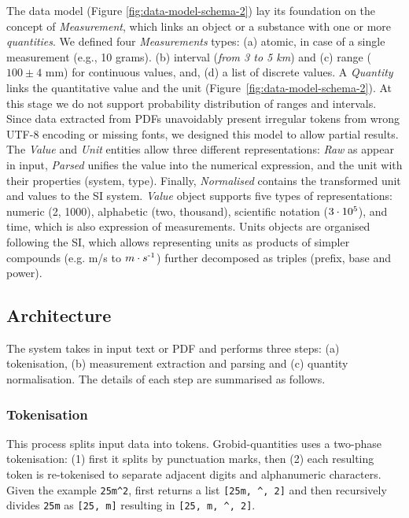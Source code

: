 \documentclass[sigconf]{acmart}
\begin{document}
The data model (Figure \ref{fig:data-model-schema-2}) lay its foundation on the concept of \textit{Measurement}, which links an object or a substance with one or more \textit{quantities}. We defined four \textit{Measurements} types: (a) atomic, in case of a single measurement (e.g., 10 grams). (b) interval (\textit{from 3 to 5 km}) and (c) range ($100 \pm 4$ mm) for continuous values, and, (d) a list of discrete values. A \textit{Quantity} links the quantitative value and the unit (Figure~\ref{fig:data-model-schema-2}). At this stage we do not support probability distribution of ranges and intervals. 
Since data extracted from PDFs unavoidably present irregular tokens from wrong UTF-8 encoding or missing fonts, we designed this model to allow partial results. The \textit{Value} and \textit{Unit} entities allow three different representations: \textit{Raw} as appear in input, \textit{Parsed} unifies the value into the numerical expression, and the unit with their properties (system, type). Finally, \textit{Normalised} contains the transformed unit and values to the SI system. \textit{Value} object supports five types of representations: numeric (2, 1000), alphabetic (two, thousand), scientific notation ($3\cdot10\textsuperscript{5}$), and time, which is also expression of measurements. Units objects are organised following the SI, which allows representing units as products of simpler compounds (e.g. m/s to $m \cdot s\textsuperscript{-1}$) further decomposed as triples (prefix, base and power).

\subsection{Architecture}
The system takes in input text or PDF and performs three steps: (a) tokenisation, (b) measurement extraction and parsing and (c) quantity normalisation. The details of each step are summarised as follows.

\subsubsection{Tokenisation}
This process splits input data into tokens. Grobid-quantities uses a two-phase tokenisation: (1) first it splits by punctuation marks, then (2) each resulting token is re-tokenised to separate adjacent digits and alphanumeric characters. Given the example \texttt{25m\^{}2}, first returns a list \texttt{[25m, \^{}, 2]} and then recursively divides \texttt{25m} as \texttt{[25, m]}  resulting in \texttt{[25, m, \^{}, 2]}.
\end{document}
